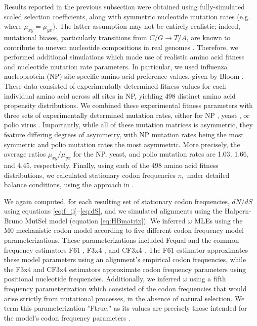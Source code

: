 \documentclass{pnastwo}
\begin{document}
\begin{article}
Results reported in the previous subsection were obtained using fully-simulated scaled selection coefficients, along with symmetric nucleotide mutation rates (e.g. where $\mu_{xy} = \mu_{yx}$). The latter assumption may not be entirely realistic; indeed, mutational biases, particularly transitions from $C/G \rightarrow T/A$, are known to contribute to uneven nucleotide compositions in real genomes \cite{Hernandez2007,HershbergPetrov2010,Zhu2014,Acevedo2014}. Therefore, we performed additional simulations which made use of realistic amino acid fitness and nucleotide mutation rate parameters. In particular, we used influenza nucleoprotein (NP) site-specific amino acid preference values, given by Bloom \cite{Bloom2014a}. These data consisted of experimentally-determined fitness values for each individual amino acid across all sites in NP, yielding 498 distinct amino acid propensity distributions. We combined these experimental fitness parameters with three sets of experimentally determined mutation rates, either for NP \cite{Bloom2014a}, yeast \cite{Zhu2014}, or polio virus \cite{Acevedo2014}. Importantly, while all of these mutation matrices is asymmetric, they feature differing degrees of asymmetry, with NP mutation rates being the most symmetric and polio mutation rates the most asymmetric. More precisely, the average ratios $\mu_{xy}/\mu_{yx}$ for the NP, yeast, and polio mutation rates are 1.03, 1.66, and 4.45, respectively. Finally, using each of the 498 amino acid fitness distributions, we calculated stationary codon frequencies $\pi_i$ under detailed balance conditions, using the approach in \cite{Bloom2014a,Bloom2014b}. 

We again computed, for each resulting set of stationary codon frequencies, $dN/dS$ using equations \eqref{eq:f_ij}--\eqref{eq:dS}, and we simulated alignments using the Halpern-Bruno MutSel model (equation \eqref{eq:HBmatrix}). We inferred $\omega$ MLEs using the M0 mechanistic codon model according to five different codon frequency model parameterizations. These parameterizations included Fequal \cite{Yang2006} and the common frequency estimators F61 \cite{GoldmanYang1994}, F3x4 \cite{MuseGaut1994}, and CF3x4 \cite{Pond2010}. The F61 estimator approximates these model parameters using an alignment's empirical codon frequencies, while the 
F3x4 and CF3x4 estimators approximate codon frequency parameters using positional nucleotide frequencies. Additionally, we inferred $\omega$ using a fifth frequency parameterization which consisted of the codon frequencies that would arise strictly from mutational processes, in the absence of natural selection. We term this parameterization "Ftrue," as its values are precisely those intended for the model's codon frequency parameters \cite{GoldmanYang1994,MuseGaut1994,YN00,Yang2006}.



\end{article}
\end{document}
